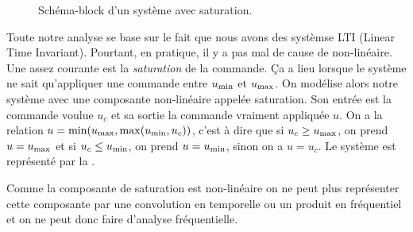 \begin{figure}[!ht]
  \centering
  \caption{Schéma-block d'un système avec saturation.}
  \label{fig:windup-block}
\end{figure}

Toute notre analyse se base sur le fait que nous avons des systèmse LTI (Linear Time Invariant).
Pourtant, en pratique, il y a pas mal de cause de non-linéaire.
Une assez courante est la \emph{saturation} de la commande.
Ça a lieu lorsque le système ne sait qu'appliquer une commande entre $u_\mathrm{min}$ et $u_\mathrm{max}$.
On modélise alors notre système avec une composante non-linéaire appelée saturation.
Son entrée est la commande voulue $u_c$ et sa sortie la commande vraiment appliquée $u$.
On a la relation $u = \min(u_\mathrm{max}, \max(u_\mathrm{min}, u_c))$, c'est à dire que si $u_c \geq u_\mathrm{max}$,
on prend $u = u_\mathrm{max}$ et si $u_c \leq u_\mathrm{min}$, on prend $u = u_\mathrm{min}$, sinon on a $u = u_c$.
Le système est représenté par la .

Comme la composante de saturation est non-linéaire on ne peut plus représenter cette composante
par une convolution en temporelle ou un produit en fréquentiel et on ne peut donc faire d'analyse
fréquentielle.

